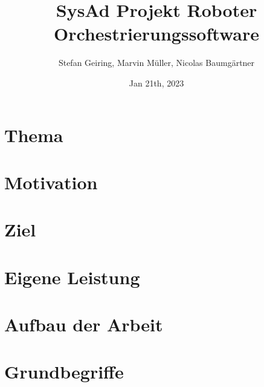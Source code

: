 \documentclass[11pt,twoside,a4paper,titlepage]{article}
\title{{SysAd Projekt Roboter Orchestrierungssoftware}}
\author{Stefan Geiring, Marvin Müller, Nicolas Baumgärtner}
\date{Jan 21th, 2023}
\begin{document}
\setlength{\parindent}{0pt}






\newpage

\pagestyle{fancy}


\tableofcontents

\fancyhead[RO,LE]{\nouppercase{\leftmark}}
\fancyfoot[RO,LE]{\thepage}

\renewcommand{\headrulewidth}{0.5pt}

\setcounter{page}{1}

\newpage



\section{Thema}


\section{Motivation}


\section{Ziel}


\section{Eigene Leistung}


\section{Aufbau der Arbeit}

\pagebreak

\section{Grundbegriffe}

\pagebreak
\end{document}
